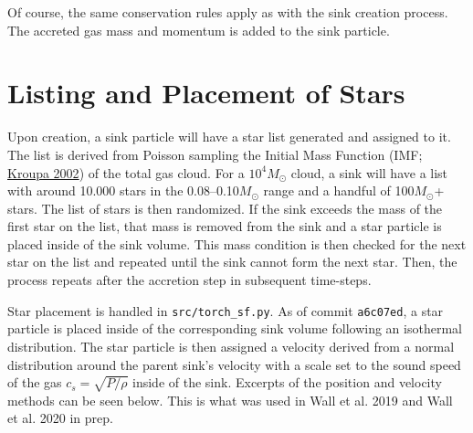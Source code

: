 \documentclass[10pt]{article}
\begin{document}
Of course, the same conservation rules apply as with the sink creation process. The accreted gas mass and momentum is added to the sink particle.
\section{Listing and Placement of Stars}
Upon creation, a sink particle will have a star list generated and assigned to it. The list is derived from Poisson sampling the Initial Mass Function (IMF; \href{https://ui.adsabs.harvard.edu/abs/2002Sci...295...82K/abstract}{Kroupa 2002}) of the total gas cloud. For a $10^4 M_{\odot}$ cloud, a sink will have a list with around 10.000 stars in the 0.08--0.10$M_{\odot}$ range and a handful of 100$M_{\odot}$+ stars. The list of stars is then randomized. If the sink exceeds the mass of the first star on the list, that mass is removed from the sink and a star particle is placed inside of the sink volume. This mass condition is then checked for the next star on the list and repeated until the sink cannot form the next star. Then, the process repeats after the accretion step in subsequent time-steps.

Star placement is handled in \texttt{src/torch\_sf.py}. As of commit \texttt{a6c07ed}, a star particle is placed inside of the corresponding sink volume following an isothermal distribution. The star particle is then assigned a velocity derived from a normal distribution around the parent sink's velocity with a scale set to the sound speed of the gas $c_{s} = \sqrt{P/\rho}$ inside of the sink. Excerpts of the position and velocity methods can be seen below. This is what was used in Wall et al. 2019 and Wall et al. 2020 in prep.
\end{document}
